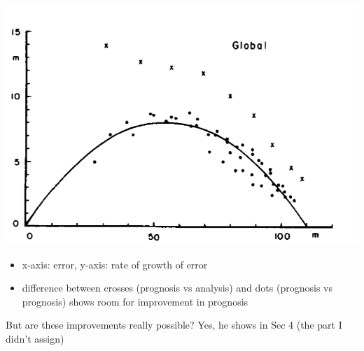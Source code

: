 \documentclass[aspectratio=169]{beamer}
\begin{document}
\begin{frame}
\begin{columns}[c]
\begin{center}
\begin{center}
\end{center}
    \end{center}
\end{columns}

\end{frame}
\begin{frame}

\begin{center}
\includegraphics[height = 0.5\textheight]{figures/lorenz_atmospheric_1982_fig2}
\end{center}

\begin{itemize}
\item x-axis: error, y-axis: rate of growth of error
\pause
\item difference between crosses (prognosis vs analysis) and dots (prognosis vs prognosis) shows room for improvement in prognosis
\end{itemize}

\end{frame}
\begin{frame}

But are these improvements really possible? Yes, he shows in Sec 4 (the part I didn't assign)

\end{frame}
\end{document}
